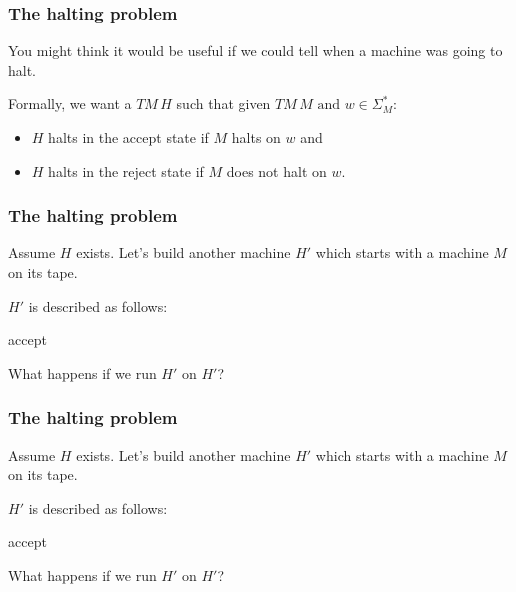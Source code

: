 \documentclass[aspectratio=169]{beamer}
\begin{document}
\begin{frame}
\frametitle{The halting problem}
You might think it would be useful if we could tell when a machine was going to halt.

Formally, we want a $TM\, H$ such that given $TM\, M \text{ and } w \in \Sigma_M^*$:

\begin{itemize}
    \item $H$ halts in the accept state if $M$ halts on $w$ and
    \item $H$ halts in the reject state if $M$ does not halt on $w$.
\end{itemize}

\begin{center}
\end{center}

\end{frame}

\begin{frame}
\frametitle{The halting problem}

Assume $H$ exists. Let's build another machine $H'$ which starts with a machine $M$ on its tape.

$H'$ is described as follows:
\begin{algorithm}[H]
{accept}
\end{algorithm}

What happens if we run $H'$ on $H'$?

\end{frame}

\begin{frame}[noframenumbering]
\frametitle{The halting problem}

Assume $H$ exists. Let's build another machine $H'$ which starts with a machine $M$ on its tape.

$H'$ is described as follows:
\begin{algorithm}[H]
{accept }
\end{algorithm}

What happens if we run $H'$ on $H'$?

\end{frame}
\end{document}
